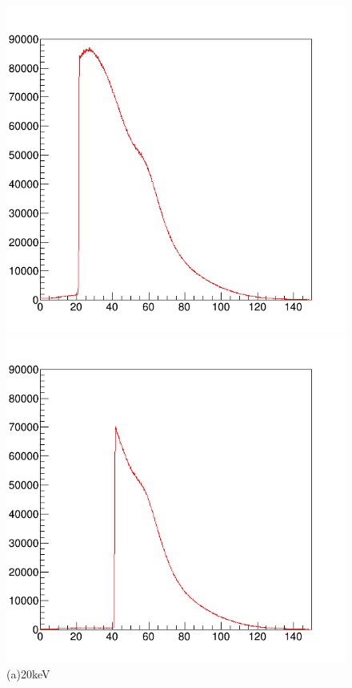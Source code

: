 \begin{figure}[H]
 \begin{minipage}{0.52\hsize}
  \begin{center}
   \includegraphics[bb=0.000000 0.000000 596.000000 574.000000,width=1.0\hsize]{image2/chapter5/120kV_0.1mA_20keV_100sec.png}
  \end{center}
\vspace{-1cm}
\caption*{(a)20keV}
 \end{minipage}
 \begin{minipage}{0.52\hsize}
  \begin{center}
    \includegraphics[bb=0.000000 0.000000 596.000000 574.000000,width=1.0\hsize]{image2/chapter5/120kV_0.1mA_40keV_100sec.png}

\end{center}
\end{minipage}
\end{figure}
